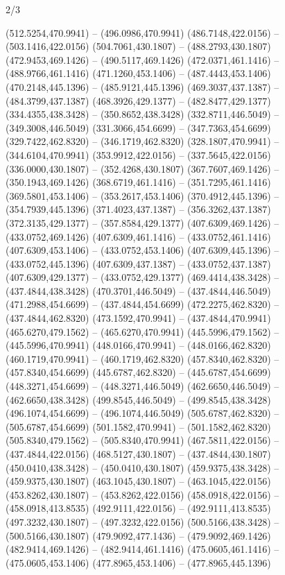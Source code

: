 \begin{flagdescription}{2/3}
\begin{scope}[xshift=0.5\flaglength,yshift=0.5\flagwidth,scale=\flagwidth/562]
\begin{scope}[y=1pt, x=1pt, yscale=-1,shift={(-421.88,-281.25)}]
 (512.5254,470.9941) -- (496.0986,470.9941) (486.7148,422.0156) -- (503.1416,422.0156)
 (504.7061,430.1807) -- (488.2793,430.1807) (472.9453,469.1426) -- (490.5117,469.1426)
 (472.0371,461.1416) -- (488.9766,461.1416) (471.1260,453.1406) -- (487.4443,453.1406)
 (470.2148,445.1396) -- (485.9121,445.1396) (469.3037,437.1387) -- (484.3799,437.1387)
 (468.3926,429.1377) -- (482.8477,429.1377) (334.4355,438.3428) -- (350.8652,438.3428)
 (332.8711,446.5049) -- (349.3008,446.5049) (331.3066,454.6699) -- (347.7363,454.6699)
 (329.7422,462.8320) -- (346.1719,462.8320) (328.1807,470.9941) -- (344.6104,470.9941)
 (353.9912,422.0156) -- (337.5645,422.0156) (336.0000,430.1807) -- (352.4268,430.1807)
 (367.7607,469.1426) -- (350.1943,469.1426) (368.6719,461.1416) -- (351.7295,461.1416)
 (369.5801,453.1406) -- (353.2617,453.1406) (370.4912,445.1396) -- (354.7939,445.1396)
 (371.4023,437.1387) -- (356.3262,437.1387) (372.3135,429.1377) -- (357.8584,429.1377)
 (407.6309,469.1426) -- (433.0752,469.1426) (407.6309,461.1416) -- (433.0752,461.1416)
 (407.6309,453.1406) -- (433.0752,453.1406) (407.6309,445.1396) -- (433.0752,445.1396)
 (407.6309,437.1387) -- (433.0752,437.1387) (407.6309,429.1377) -- (433.0752,429.1377)
 (469.4414,438.3428) -- (437.4844,438.3428) (470.3701,446.5049) -- (437.4844,446.5049)
 (471.2988,454.6699) -- (437.4844,454.6699) (472.2275,462.8320) -- (437.4844,462.8320)
 (473.1592,470.9941) -- (437.4844,470.9941) (465.6270,479.1562) -- (465.6270,470.9941)
 (445.5996,479.1562) -- (445.5996,470.9941) (448.0166,470.9941) -- (448.0166,462.8320)
 (460.1719,470.9941) -- (460.1719,462.8320) (457.8340,462.8320) -- (457.8340,454.6699)
 (445.6787,462.8320) -- (445.6787,454.6699) (448.3271,454.6699) -- (448.3271,446.5049)
 (462.6650,446.5049) -- (462.6650,438.3428) (499.8545,446.5049) -- (499.8545,438.3428)
 (496.1074,454.6699) -- (496.1074,446.5049) (505.6787,462.8320) -- (505.6787,454.6699)
 (501.1582,470.9941) -- (501.1582,462.8320) (505.8340,479.1562) -- (505.8340,470.9941)
 (467.5811,422.0156) -- (437.4844,422.0156) (468.5127,430.1807) -- (437.4844,430.1807)
 (450.0410,438.3428) -- (450.0410,430.1807) (459.9375,438.3428) -- (459.9375,430.1807)
 (463.1045,430.1807) -- (463.1045,422.0156) (453.8262,430.1807) -- (453.8262,422.0156)
 (458.0918,422.0156) -- (458.0918,413.8535) (492.9111,422.0156) -- (492.9111,413.8535)
 (497.3232,430.1807) -- (497.3232,422.0156) (500.5166,438.3428) -- (500.5166,430.1807)
 (479.9092,477.1436) -- (479.9092,469.1426) (482.9414,469.1426) -- (482.9414,461.1416)
 (475.0605,461.1416) -- (475.0605,453.1406) (477.8965,453.1406) -- (477.8965,445.1396)

\end{scope}
\end{scope}
\end{flagdescription}
